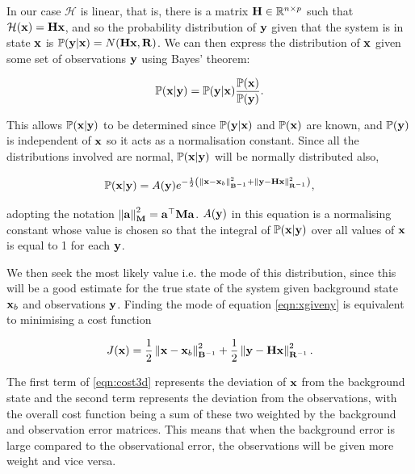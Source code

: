 In our case $\mathcal{H}$ is linear, that is, there is a matrix $\mat{H} \in \mathbb{R}^{n \times p}$ such that $\mathcal{H}(\x) = \mat{H}\x$, and so the probability distribution of $\y$ given that the system is in state $\x$ is $\prob(\y|\x) = N(\mat{H}\x,\mat{R})$. We can then express the distribution of $\x$ given some set of observations $\y$ using Bayes' theorem:

\begin{equation}
    \prob(\x|\y) = \prob(\y|\x) \frac{\prob(\x)}{\prob(\y)}.
\end{equation}

This allows $\prob(\x|\y)$ to be determined since $\prob(\y|\x)$ and $\prob(\x)$ are known, and $\prob(\y)$ is independent of $\x$ so it acts as a normalisation constant. Since all the distributions involved are normal, $\prob(\x|\y)$ will be normally distributed also,

\begin{equation}
    \prob(\x|\y) = A(\y) e^{-\frac 1 2 \left( \norm[\mat{B}^{-1}]{\x - \x_b}^2 + \norm[\mat{R}^{-1}]{\y - \mat{H}\x}^2\right)},
\label{eqn:xgiveny}
\end{equation}

adopting the notation $\norm[\mat{M}]{\vect{a}}^2 = \vect{a}^\top \mat{M} \vect{a}$. $A(\y)$ in this equation is a normalising constant whose value is chosen so that the integral of $\prob(\x|\y)$ over all values of $\x$ is equal to 1 for each $\y$.

We then seek the most likely value i.e. the mode of this distribution, since this will be a good estimate for the true state of the system given background state $\x_b$ and observations $\y$. Finding the mode of equation \ref{eqn:xgiveny} is equivalent to minimising a cost function

\begin{equation}
    J(\x) = \frac 1 2 \norm[\mat{B}^{-1}]{\x - \x_b}^2 + \frac 1 2 \norm[\mat{R}^{-1}]{\y - \mat{H}\x}^2.
    \label{eqn:cost3d}
\end{equation}

The first term of \ref{eqn:cost3d} represents the deviation of $\x$ from the background state and the second term represents the deviation from the observations, with the overall cost function being a sum of these two weighted by the background and observation error matrices. This means that when the background error is large compared to the observational error, the observations will be given more weight and vice versa.

